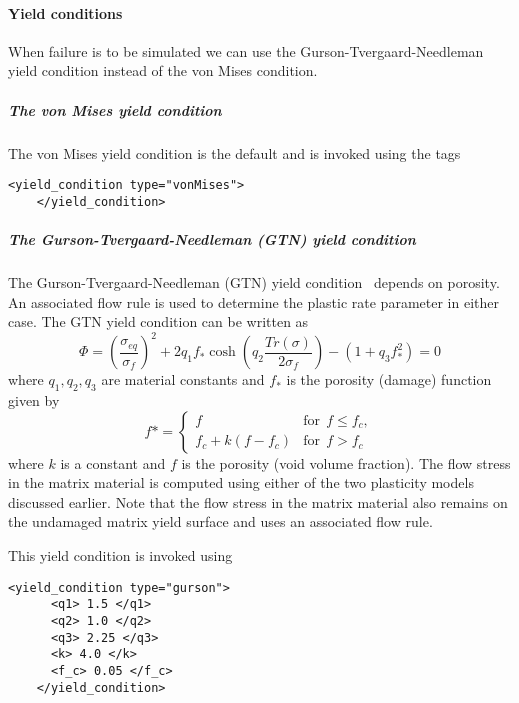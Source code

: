   \paragraph{Yield conditions}
  When failure is to be simulated we can use the Gurson-Tvergaard-Needleman
  yield condition instead of the von Mises condition.

  \subparagraph{The von Mises yield condition}
  The von Mises yield condition is the default and is invoked using the tags
  \begin{Verbatim}[fontsize=\footnotesize]
    <yield_condition type="vonMises">
    </yield_condition>
  \end{Verbatim}

  \subparagraph{The Gurson-Tvergaard-Needleman (GTN) yield condition}
  The Gurson-Tvergaard-Needleman (GTN) yield
  condition~\cite{Gurson77,Tver84} depends on porosity.  An associated
  flow rule is used to determine the plastic rate parameter in either case.
  The GTN yield condition can be written as
  \begin{equation}
    \Phi = \left(\frac{\sigma_{eq}}{\sigma_f}\right)^2 +
    2 q_1 f_* \cosh \left(q_2 \frac{Tr(\sigma)}{2\sigma_f}\right) -
    (1+q_3 f_*^2) = 0
  \end{equation}
  where $q_1,q_2,q_3$ are material constants and $f_*$ is the porosity
  (damage) function given by
  \begin{equation}
    f* = 
    \begin{cases}
      f & \text{for}~~ f \le f_c,\\ 
      f_c + k (f - f_c) & \text{for}~~ f > f_c 
    \end{cases}
  \end{equation}
  where $k$ is a constant and $f$ is the porosity (void volume fraction).  The
  flow stress in the matrix material is computed using either of the two
  plasticity models discussed earlier.  Note that the flow stress in the matrix
  material also remains on the undamaged matrix yield surface and uses an
  associated flow rule.

  This yield condition is invoked using
  \begin{Verbatim}[fontsize=\footnotesize]
    <yield_condition type="gurson">
      <q1> 1.5 </q1>
      <q2> 1.0 </q2>
      <q3> 2.25 </q3>
      <k> 4.0 </k>
      <f_c> 0.05 </f_c>
    </yield_condition>
  \end{Verbatim}

